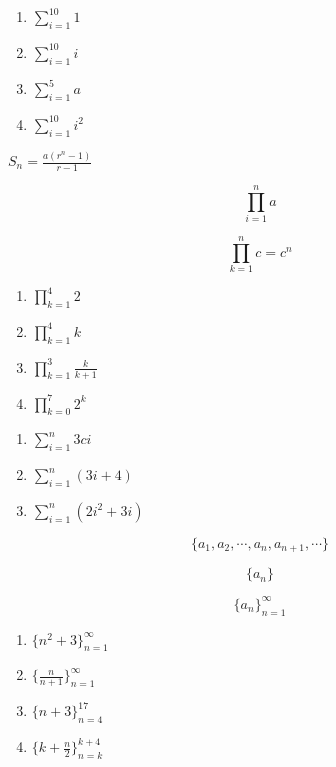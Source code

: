 \documentclass[twocolumn]{article}
\newcounter{marks}
\begin{document}
\begin{enumerate}
    \item $ \sum_{i=1}^{10} 1 $

    \item $ \sum_{i=1}^{10} i $

    \item $ \sum_{i=1}^{5} a $

    \item $ \sum_{i=1}^{10} i^2 $
\end{enumerate}




$ S_n = \frac{a(r^n - 1)}{r-1}$

$$ \prod_{i=1}^{n} a $$

$$ \prod_{k=1}^{n} c = c^n $$

\begin{enumerate}
    \item $ \prod_{k=1}^{4} 2 $

    \item $ \prod_{k=1}^{4} k $
    
    \item $ \prod_{k=1}^{3} \frac{k}{k+1} $

    \item $ \prod_{k=0}^{7} 2^k $
\end{enumerate}


\begin{enumerate}
    \item $ \sum_{i=1}^{n} 3ci $

    \item $ \sum_{i=1}^{n} (3i + 4) $

    \item $ \sum_{i=1}^{n} (2i^2 + 3i) $
\end{enumerate}

$$ \{a_1, a_2, \cdots, a_n, a_{n+1}, \cdots \} $$

$$ \{ a_n \} $$

$$ \{ a_n \}_{n=1}^{\infty} $$

\begin{enumerate}
    \item $ \{ n^2 + 3 \}_{n=1}^{\infty} $
    \item $ \{ \frac{n}{n+1} \}_{n=1}^{\infty} $
    \item $ \{ n + 3 \}_{n=4}^{17} $
    \item $ \{ k + \frac{n}{2} \}_{n=k}^{k+4} $
\end{enumerate}
\fi
\fi
\end{document}
